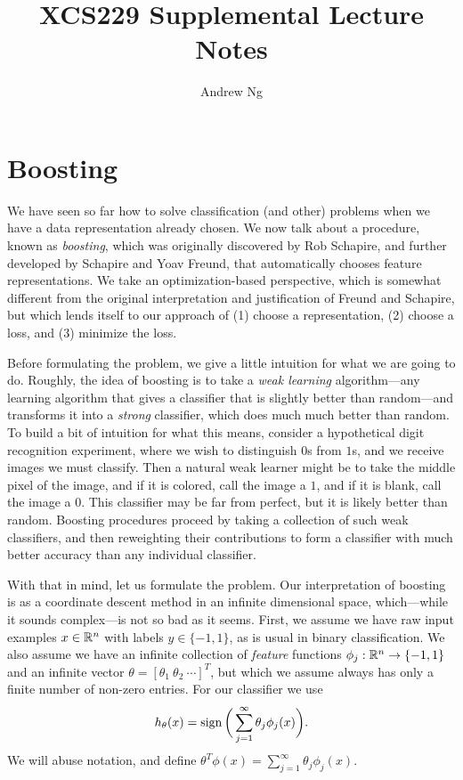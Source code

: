 \documentclass{article}
\newcommand{\represent}{\phi}
\begin{document}
\title{XCS229 Supplemental Lecture Notes}
\author{Andrew Ng}
\date{}
\maketitle

\section{Boosting}

We have seen so far how to solve classification (and other) problems when we
have a data representation already chosen. We now talk about a procedure,
known as \emph{boosting}, which was originally discovered by Rob Schapire,
and further developed by Schapire and Yoav Freund, that automatically
chooses feature representations. We take an optimization-based perspective,
which is somewhat different from the original interpretation and
justification of Freund and Schapire, but which lends itself to our approach
of (1) choose a representation, (2) choose a loss, and (3) minimize the
loss.

Before formulating the problem, we give a little intuition for what we are
going to do. Roughly, the idea of boosting is to take a \emph{weak learning}
algorithm---any learning algorithm that gives a classifier that is slightly
better than random---and transforms it into a \emph{strong} classifier,
which does much much better than random. To build a bit of intuition for
what this means, consider a hypothetical digit recognition experiment, where
we wish to distinguish $0$s from $1$s, and we receive images we must
classify. Then a natural weak learner might be to take the middle pixel of
the image, and if it is colored, call the image a $1$, and if it is blank,
call the image a $0$. This classifier may be far from perfect, but it is
likely better than random. Boosting procedures proceed by taking a
collection of such weak classifiers, and then reweighting their
contributions to form a classifier with much better accuracy than any
individual classifier.

With that in mind, let us formulate the problem. Our interpretation of
boosting is as a coordinate descent method in an infinite dimensional space,
which---while it sounds complex---is not so bad as it seems. First,
we assume we have raw input examples $x \in \mathbb{R}^n$ with labels $y \in \{-1,
1\}$, as is usual in binary classification. We also assume we have an
infinite collection of \emph{feature} functions $\represent_j : \R^n \to \{-1, 1\}$
and an infinite vector $\theta = [\theta_1 ~ \theta_2 ~ \cdots ]^T$, but
which we assume always has only a finite number of non-zero entries. For our
classifier we use
\begin{equation*}
  h_\theta(x) = \sign\bigg(\sum_{j = 1}^\infty \theta_j \represent_j(x) \bigg).
\end{equation*}
We will abuse notation, and define $\theta^T \represent(x) = \sum_{j = 1}^\infty
\theta_j \represent_j(x)$.
\end{document}
